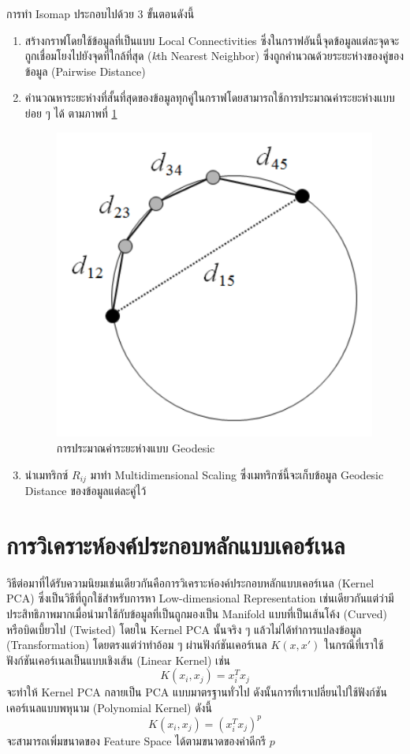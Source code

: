 การทำ Isomap ประกอบไปด้วย 3 ขั้นตอนดังนี้
%
\begin{enumerate}[topsep=0pt,noitemsep]\setlength\itemsep{0.5em}
    \item สร้างกราฟโดยใช้ข้อมูลที่เป็นแบบ Local Connectivities ซึ่งในกราฟอันนี้จุดข้อมูลแต่ละจุดจะถูกเชื่อมโยงไปยังจุดที่ใกล้ที่สุด (\textit{k}th Nearest Neighbor) ซึ่งถูกคำนวณด้วยระยะห่างของคู่ของข้อมูล (Pairwise Distance)

    \item คำนวณหาระยะห่างที่สั้นที่สุดของข้อมูลทุกคู่ในกราฟโดยสามารถใช้การประมาณค่าระยะห่างแบบย่อย ๆ ได้ ตามภาพที่
          \ref{fig:approx_geodesic}

          \begin{figure}[H]
              \centering
              \includegraphics[width=0.3\linewidth]{fig/approx_geodesic.png}
              \caption{การประมาณค่าระยะห่างแบบ Geodesic}
              \label{fig:approx_geodesic}
          \end{figure}

    \item นำเมทริกซ์ $R_{ij}$ มาทำ Multidimensional Scaling ซึ่งเมทริกซ์นี้จะเก็บข้อมูล Geodesic Distance ของข้อมูลแต่ละคู่ไว้
\end{enumerate}

\section{การวิเคราะห์องค์ประกอบหลักแบบเคอร์เนล}
\label{sec:kernel_pca}

วิธีต่อมาที่ได้รับความนิยมเช่นเดียวกันคือการวิเคราะห์องค์ประกอบหลักแบบเคอร์เนล (Kernel PCA)\autocite{scholkopf1998} ซึ่งเป็นวิธีที่ถูกใช้สำหรับการหา Low-dimensional Representation เช่นเดียวกันแต่ว่ามีประสิทธิภาพมากเมื่อนำมาใช้กับข้อมูลที่เป็นถูกมองเป็น Manifold แบบที่เป็นเส้นโค้ง (Curved) หรือบิดเบี้ยวไป (Twisted) โดยใน Kernel PCA นั้นจริง ๆ แล้วไม่ได้ทำการแปลงข้อมูล (Transformation) โดยตรงแต่ว่าทำอ้อม ๆ ผ่านฟังก์ชันเคอร์เนล $K(x,x')$ ในกรณีที่เราใช้ฟังก์ชันเคอร์เนลเป็นแบบเชิงเส้น (Linear Kernel) เช่น
%
\begin{equation}
    K(x_{i},x_{j}) = x^{T}_{i}x_{j}
\end{equation}
%
\noindent จะทำให้ Kernel PCA กลายเป็น PCA แบบมาตรฐานทั่วไป ดังนั้นการที่เราเปลี่ยนไปใช้ฟังก์ชันเคอร์เนลแบบพหุนาม (Polynomial Kernel) ดังนี้
%
\begin{equation}
    K(x_{i},x_{j}) = (x^{T}_{i}x_{j})^{p}
\end{equation}
%
\noindent จะสามารถเพิ่มขนาดของ Feature Space ได้ตามขนาดของค่าดีกรี $p$

